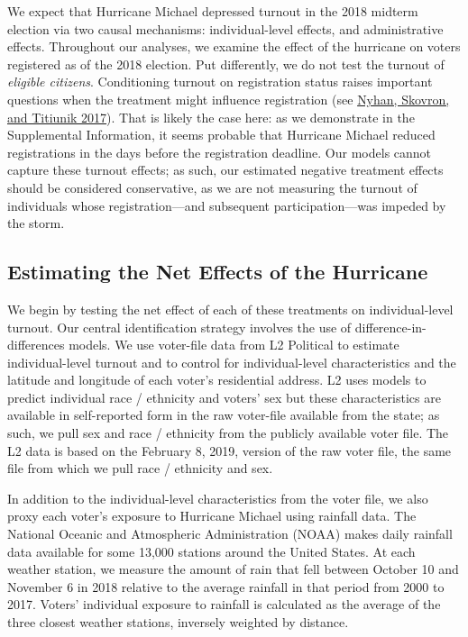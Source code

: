 \documentclass[
  12pt,
]{article}
\begin{document}
We expect that Hurricane Michael depressed turnout in the 2018 midterm election via two causal mechanisms: individual-level effects, and administrative effects. Throughout our analyses, we examine the effect of the hurricane on voters registered as of the 2018 election. Put differently, we do not test the turnout of \emph{eligible citizens}. Conditioning turnout on registration status raises important questions when the treatment might influence registration (see \protect\hyperlink{ref-Nyhan2017}{Nyhan, Skovron, and Titiunik 2017}). That is likely the case here: as we demonstrate in the Supplemental Information, it seems probable that Hurricane Michael reduced registrations in the days before the registration deadline. Our models cannot capture these turnout effects; as such, our estimated negative treatment effects should be considered conservative, as we are not measuring the turnout of individuals whose registration---and subsequent participation---was impeded by the storm.

\hypertarget{estimating-the-net-effects-of-the-hurricane}{%
\subsection*{Estimating the Net Effects of the Hurricane}\label{estimating-the-net-effects-of-the-hurricane}}

We begin by testing the net effect of each of these treatments on individual-level turnout. Our central identification strategy involves the use of difference-in-differences models. We use voter-file data from L2 Political to estimate individual-level turnout and to control for individual-level characteristics and the latitude and longitude of each voter's residential address. L2 uses models to predict individual race / ethnicity and voters' sex but these characteristics are available in self-reported form in the raw voter-file available from the state; as such, we pull sex and race / ethnicity from the publicly available voter file. The L2 data is based on the February 8, 2019, version of the raw voter file, the same file from which we pull race / ethnicity and sex.

In addition to the individual-level characteristics from the voter file, we also proxy each voter's exposure to Hurricane Michael using rainfall data. The National Oceanic and Atmospheric Administration (NOAA) makes daily rainfall data available for some 13,000 stations around the United States. At each weather station, we measure the amount of rain that fell between October 10 and November 6 in 2018 relative to the average rainfall in that period from 2000 to 2017. Voters' individual exposure to rainfall is calculated as the average of the three closest weather stations, inversely weighted by distance.
\end{document}
